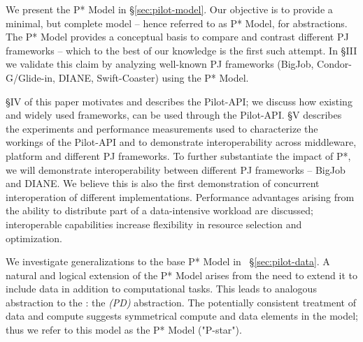 \documentclass{sig-alternate}
\begin{document}


We present the P* Model in \S\ref{sec:pilot-model}.  Our objective is to provide a
minimal, but complete model -- hence referred to as P* Model, for
\pilotjob abstractions.  The P* Model provides a conceptual basis
to compare and contrast different PJ frameworks -- which to the best of
our knowledge is the first such attempt. In \S{III} we validate this
claim by analyzing well-known PJ frameworks (BigJob,
Condor-G/Glide-in, DIANE, Swift-Coaster) using the P* Model.



\S{IV} of this paper motivates and describes the Pilot-API;  we
discuss how %
existing and widely used \pilotjob frameworks, can be used through the
Pilot-API.  \S{V} describes the experiments and performance
measurements used to characterize the workings of the Pilot-API and to
demonstrate interoperability across middleware, platform and different
PJ frameworks.  To further substantiate the impact of P*, we will
demonstrate interoperability between different PJ frameworks -- BigJob
and DIANE. We believe this is also the first demonstration of
concurrent interoperation of different \pilotjob implementations.
Performance advantages arising from the ability to distribute part of a
data-intensive workload are discussed; interoperable capabilities
increase flexibility in resource selection and optimization.

We investigate generalizations to the base P* Model
in \ \S\ref{sec:pilot-data}.  A natural and logical extension of the
P* Model arises from the need to extend it to include data in
addition to computational tasks.  This leads to analogous abstraction
to the \pilotjob: the \emph{\pilotdata (PD)} abstraction.  The
potentially consistent treatment of data and compute suggests
symmetrical compute and data elements in the model; thus we refer
to this model as the P* Model ("P-star").
\end{document}
